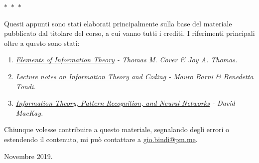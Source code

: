 \begin{center}
  $\ast$~$\ast$~$\ast$
\end{center}

Questi appunti sono stati elaborati principalmente sulla base del materiale pubblicato dal titolare del corso, a cui vanno tutti i crediti. I riferimenti principali oltre a questo sono stati:
\begin{enumerate}
    \item \textit{\href{https://www.wiley.com/en-it/Elements+of+Information+Theory,+2nd+Edition-p-9780471241959}{Elements of Information Theory} - Thomas M. Cover \& Joy A. Thomas.}
    \item \textit{\href{http://clem.dii.unisi.it/~vipp/files/TIC/dispense.pdf}{Lecture notes on Information Theory and Coding} - Mauro Barni \& Benedetta Tondi.}
    \item \textit{\href{http://www.inference.org.uk/mackay/itprnn/book.html}{Information Theory, Pattern Recognition, and Neural Networks} - David MacKay.}
\end{enumerate}
Chiunque volesse contribuire a questo materiale, segnalando degli errori o estendendo il contenuto, mi pu\`o contattare a \href{mailto:gio.bindi@pm.me}{gio.bindi@pm.me}.
\begin{flushright}
Novembre 2019.
\end{flushright}